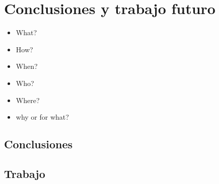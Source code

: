\chapter{Conclusiones y trabajo futuro}\label{chap:concl}

\begin{graybox}
\begin{itemize}
\item What?
\item How?
\item When?
\item Who?
\item Where?
\item why or for what?
\end{itemize}
\end{graybox}



\section*{Conclusiones}



\section*{Trabajo}


